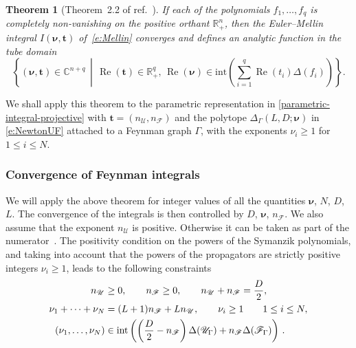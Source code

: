 \documentclass[12pt,a4paper]{article}
\theoremstyle{plain}
\newtheorem{theorem}{Theorem}[section]
\theoremstyle{remark}
\newcommand{\nprops}{N}
\newcommand{\cU}{\mathscr {U}}
\newcommand{\cF}{\mathscr {F}}
\renewcommand{\Re}{\operatorname{Re}}
\newcommand{\undernotation}[1]{\pmb{#1}}
\newcommand{\Newton}{\Delta}
\begin{document}
		\begin{theorem}[Theorem~2.2 of ref.~\cite{2011arXiv1103.6273B}]\label{thm:conv}
			If each of the polynomials $f_1,\dots,f_q$ is completely non-vanishing on the positive
			orthant $\mathbb R^n_+$, then the Euler--Mellin integral $ I(\undernotation \nu,\undernotation t) $ of~\cref{e:Mellin} converges and
			defines an analytic function in the tube domain
			\begin{equation}
				\label{e:DomainConvergence}
				\left\{  (\undernotation{\nu},\undernotation t) \in \mathbb C^{n+q} \, \middle| \,
				\Re(\undernotation t) \in \mathbb R_+^q, \, 
				\Re(\undernotation{\nu})\in{\mathrm{int}}\left(\sum_{i=1}^q \Re( t_i) \Newton(f_i)\right) \right\} .
			\end{equation}
			
		\end{theorem}
		We shall apply this theorem to the parametric representation in
		\cref{parametric-integral-projective} with $\undernotation
		t=(n_\cU,n_\cF)$ and the polytope 
		$\Delta_\Gamma(L,D;\undernotation{\nu})$ in \cref{e:NewtonUF} attached to a Feynman graph
		$\Gamma$, with the exponents $\nu_i\geq1$ for $1\leq i\leq \nprops$.
        
		\subsubsection{Convergence of Feynman integrals}
        We will apply the above theorem for integer values of all the quantities $\undernotation \nu$, $\nprops$, $D$, $L$. The convergence of the integrals 
		is then controlled by $D$, $\undernotation \nu$, $n_\cF$. We also assume that the exponent $n_\cU$ is positive. Otherwise it can be taken as part of the numerator~\cite{delaCruz:2024xsm}. 
                The positivity condition on the
		powers of the Symanzik polynomials, and taking into
                account that the powers of the propagators are
                strictly positive integers $\nu_i\geq1$, leads to the following constraints
		\begin{align}
                  \label{e:convParam}
                  n_\cU&\geq0, \qquad n_\cF\geq0,  \qquad n_\cU+n_\cF={D\over2},\cr
                  \nu_1+\cdots+\nu_{\nprops}&=(L+1)n_\cF+L n_\cU,\qquad
            \nu_i\geq1 \qquad 1\leq i\leq\nprops,\\
\nonumber                         	(\nu_1,\dots,\nu_\nprops)  &\in \textrm{int}\left(	\left({D\over2}-n_\cF\right)\Newton(\cU_\Gamma)+n_\cF \Newton(\cF_\Gamma)\right)\,.     
		\end{align}
\end{document}
